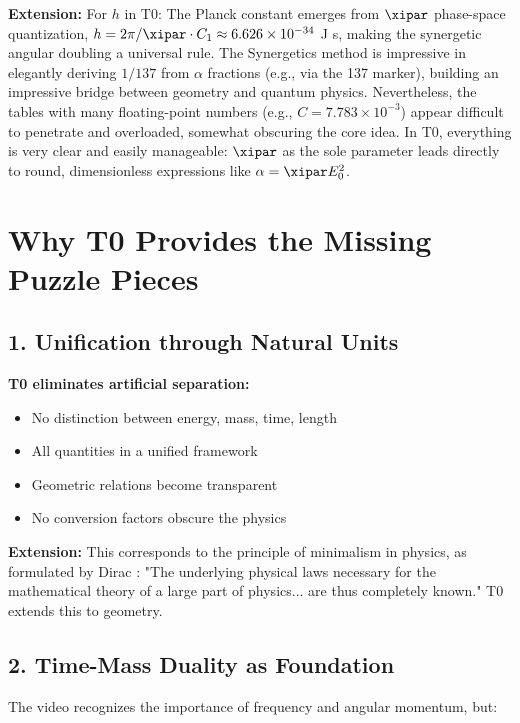 	\textbf{Extension:} For $h$ in T0: The Planck constant emerges from $\xipar$ phase-space quantization, $h = 2\pi / \xipar \cdot C_1 \approx 6.626 \times 10^{-34}$ J s, making the synergetic angular doubling a universal rule. The Synergetics method is impressive in elegantly deriving $1/137$ from $\alpha$ fractions (e.g., via the 137 marker), building an impressive bridge between geometry and quantum physics. Nevertheless, the tables with many floating-point numbers (e.g., $C = 7.783 \times 10^{-3}$) appear difficult to penetrate and overloaded, somewhat obscuring the core idea. In T0, everything is very clear and easily manageable: $\xipar$ as the sole parameter leads directly to round, dimensionless expressions like $\alpha = \xipar E_0^2$.
	
	\section{Why T0 Provides the Missing Puzzle Pieces}
	
	\subsection{1. Unification through Natural Units}
	
	\begin{vorteil}
		\textbf{T0 eliminates artificial separation:}
		\begin{itemize}
			\item No distinction between energy, mass, time, length
			\item All quantities in a unified framework
			\item Geometric relations become transparent
			\item No conversion factors obscure the physics
		\end{itemize}
		
		\textbf{Extension:} This corresponds to the principle of minimalism in physics, as formulated by Dirac \cite{dirac_principles}: "The underlying physical laws necessary for the mathematical theory of a large part of physics... are thus completely known." T0 extends this to geometry.
	\end{vorteil}
	
	\subsection{2. Time-Mass Duality as Foundation}
	
	The video recognizes the importance of frequency and angular momentum, but:
	
